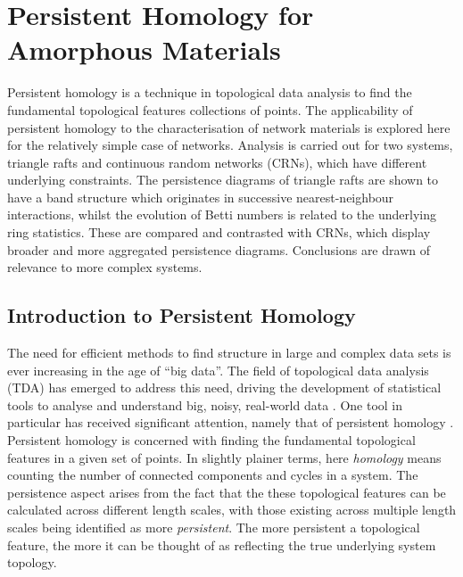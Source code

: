 \chapter[Persistent Homology for Amorphous Materials]{Persistent Homology for \\ Amorphous Materials}
\label{ch:ph}

\begin{chapterabstract}
Persistent homology is a technique in topological data analysis to find the fundamental topological features collections of points.
The applicability of persistent homology to the characterisation of network materials is explored here for the relatively simple case of \td{} networks. 
Analysis is carried out for two systems, triangle rafts and continuous random networks (CRNs), which have different underlying constraints.
The persistence diagrams of triangle rafts are shown to have a band structure which originates in successive nearest\--neighbour interactions, whilst the evolution of Betti numbers is related to the underlying ring statistics.
These are compared and contrasted with CRNs, which display broader and more aggregated persistence diagrams.
Conclusions are drawn of relevance to more complex systems.
\end{chapterabstract}

\section{Introduction to Persistent Homology}

The need for efficient methods to find structure in large and complex data sets is ever increasing in the age of ``big data''.
The field of topological data analysis (TDA) has emerged to address this need, driving the development of statistical tools to analyse and understand big, noisy, real\--world data \cite{Wasserman2018}.
One tool in particular has received significant attention, namely that of persistent homology \cite{Edelsbrunner2008}.
Persistent homology is concerned with finding the fundamental topological features in a given set of points. 
In slightly plainer terms, here \textit{homology} means counting the number of connected components and cycles  in a system.
The persistence aspect arises from the fact that the these topological features can be calculated across different length scales, with those existing across multiple length scales being identified as more \textit{persistent}.
The more persistent a topological feature, the more it can be thought of as reflecting the true underlying system topology.


